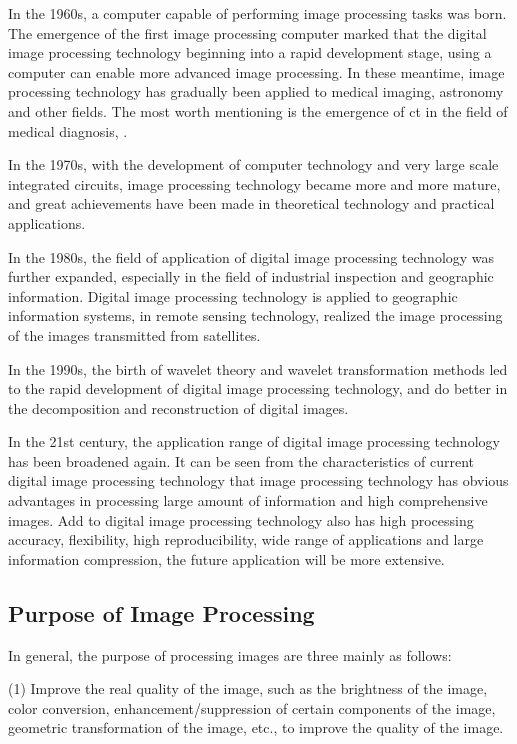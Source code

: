 In the 1960s, a computer capable of performing image processing tasks was born. The emergence of the first image processing computer marked that the digital image processing technology beginning into a rapid development stage, using a computer can enable more advanced image processing. In these meantime, image processing technology has gradually been applied to medical imaging, astronomy and other fields. The most worth mentioning is the emergence of ct in the field of medical diagnosis, .

In the 1970s, with the development of computer technology and very large scale integrated circuits, image processing technology became more and more mature, and great achievements have been made in theoretical technology and practical applications.

In the 1980s, the field of application of digital image processing technology was further expanded, especially in the field of industrial inspection and geographic information. Digital image processing technology is applied to geographic information systems, in remote sensing technology, realized the image processing of the images transmitted from satellites.

In the 1990s, the birth of wavelet theory and wavelet transformation methods led to the rapid development of digital image processing technology, and do better in  the decomposition and reconstruction of digital images.

In the 21st century, the application range of digital image processing technology has been broadened again. It can be seen from the characteristics of current digital image processing technology that image processing technology has obvious advantages in processing large amount of information and high comprehensive images. Add to digital image processing technology also has high processing accuracy, flexibility, high reproducibility, wide range of applications and large information compression, the future application will be more extensive.
\subsection{Purpose of Image Processing}
In general, the purpose of processing images are three mainly as follows\cite{ref1}:

(1) Improve the real quality of the image, such as the brightness of the image, color conversion, enhancement/suppression of certain components of the image, geometric transformation of the image, etc., to improve the quality of the image.

